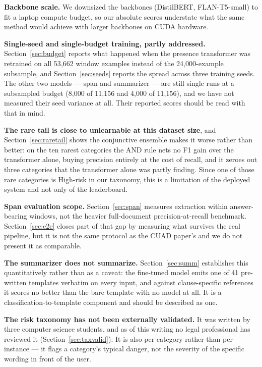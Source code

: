 \textbf{Backbone scale.} We downsized the backbones (DistilBERT, FLAN-T5-small) to fit a laptop compute budget, so our absolute scores understate what the same method would achieve with larger backbones on CUDA hardware.

\textbf{Single-seed and single-budget training, partly addressed.} Section~\ref{sec:budget} reports what happened when the presence transformer was retrained on all 53{,}662 window examples instead of the 24{,}000-example subsample, and Section~\ref{sec:seeds} reports the spread across three training seeds. The other two models --- span and summarizer --- are still single runs at a subsampled budget (8{,}000 of 11{,}156 and 4{,}000 of 11{,}156), and we have not measured their seed variance at all. Their reported scores should be read with that in mind.

\textbf{The rare tail is close to unlearnable at this dataset size}, and Section~\ref{sec:raretail} shows the conjunctive ensemble makes it worse rather than better: on the ten rarest categories the AND rule nets no F1 gain over the transformer alone, buying precision entirely at the cost of recall, and it zeroes out three categories that the transformer alone was partly finding. Since one of those rare categories is High-risk in our taxonomy, this is a limitation of the deployed system and not only of the leaderboard.

\textbf{Span evaluation scope.} Section~\ref{sec:span} measures extraction within answer-bearing windows, not the heavier full-document precision-at-recall benchmark. Section~\ref{sec:e2e} closes part of that gap by measuring what survives the real pipeline, but it is not the same protocol as the CUAD paper's and we do not present it as comparable.

\textbf{The summarizer does not summarize.} Section~\ref{sec:summ} establishes this quantitatively rather than as a caveat: the fine-tuned model emits one of 41 pre-written templates verbatim on every input, and against clause-specific references it scores no better than the bare template with no model at all. It is a classification-to-template component and should be described as one.

\textbf{The risk taxonomy has not been externally validated.} It was written by three computer science students, and as of this writing no legal professional has reviewed it (Section~\ref{sec:taxvalid}). It is also per-category rather than per-instance --- it flags a category's typical danger, not the severity of the specific wording in front of the user.


